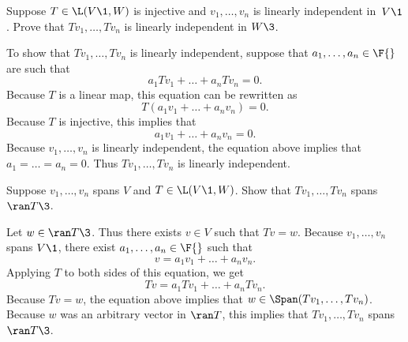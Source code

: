 \exercise
Suppose $T \in \L(V\1,W)$ is injective and $v_1, \dots, v_n$ is linearly independent in~$V\1$.  Prove that $Tv_1, \dots, Tv_n$ is linearly independent in $W\3$.\label{3001}

\begin{Solution}
To show that $Tv_1, \dots, Tv_n$ is linearly
independent, suppose that $a_1, \dots, a_n \in \F{}$ are such that
\[
a_1 Tv_1 + \dots + a_n Tv_n = 0.
\]
Because $T$ is a linear map, this equation can be rewritten as
\[
T(a_1 v_1 + \dots + a_n v_n) = 0.
\]
Because $T$ is injective, this implies that
\[
a_1 v_1 + \dots + a_n v_n = 0.
\]
Because $v_1, \dots, v_n$ is linearly independent, the equation above implies
that $a_1 = \dots = a_n = 0$.  Thus $Tv_1, \dots, Tv_n$ is linearly
independent.
\end{Solution}

\exercise
Suppose $v_1, \dots, v_n$ spans $V$ and $T \in \L(V\1,W)$. Show
that $Tv_1, \dots, Tv_n$ spans $\ran T\3$.\label{3spanrange}

\begin{Solution}
Let $w \in \ran T\3$. Thus there exists $v \in V$ such that
$Tv = w$.  Because $v_1, \dots, v_n$ spans $V\1$, there exist
$a_1, \dots, a_n \in \F{}$ such that
\[
v = a_1 v_1 + \dots + a_n v_n.
\]
Applying $T$ to both sides of this equation, we get
\[
Tv = a_1 Tv_1 + \dots + a_n Tv_n.
\]
Because $Tv = w$, the equation above implies that
$w \in \Span(Tv_1, \dots, Tv_n)$.  Because $w$ was an arbitrary vector in $\ran T$,
this implies that $Tv_1, \dots, Tv_n$ spans $\ran T\3$.
\end{Solution}

